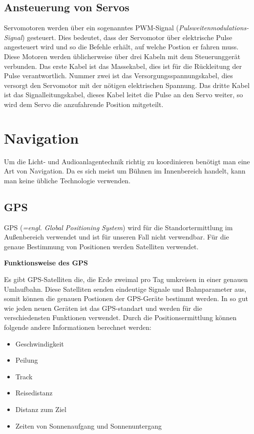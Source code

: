 \subsection{Ansteuerung von Servos}
Servomotoren werden über ein sogenanntes PWM-Signal (\emph{Pulsweitenmodulations-Signal}) gesteuert. Dies bedeutet, dass der Servomotor über elektrische Pulse angesteuert wird und so die Befehle erhält, auf welche Postion er fahren muss. Diese Motoren werden üblicherweise über drei Kabeln mit dem Steuerunggerät verbunden. Das erste Kabel ist das Massekabel, dies ist für die Rückleitung der Pulse verantwortlich. Nummer zwei ist das Versorgungsspannungskabel, dies versorgt den Servomotor mit der nötigen elektrischen Spannung. Das dritte Kabel ist das Signalleitungskabel, dieses Kabel leitet die Pulse an den Servo weiter, so wird dem Servo die anzufahrende Position mitgeteilt.\\
\cite{Servomotor_Ansteuerung}

\section{Navigation}

Um die Licht- und Audioanlagentechnik richtig zu koordinieren benötigt man eine Art von Navigation. Da es sich meist um Bühnen im Innenbereich handelt, kann man keine übliche Technologie verwenden.


\subsection{GPS}
GPS (\emph{=engl. Global Positioning System}) wird für die Standortermittlung im Außenbereich verwendet und ist für unseren Fall nicht verwendbar. Für die genaue Bestimmung von Positionen werden Satelliten verwendet.
\cite{GPS}

\textbf{Funktionsweise des GPS}

Es gibt GPS-Satelliten die, die Erde zweimal pro Tag umkreisen in einer genauen Umlaufbahn. Diese Satelliten senden eindeutige Signale und Bahnparameter aus, somit können die genauen Postionen der GPS-Geräte bestimmt werden. 
In so gut wie jeden neuen Geräten ist das GPS-standart und werden für die verschiedensten Funktionen verwendet. Durch die Positionsermittlung können folgende andere Informationen berechnet werden:

\begin{itemize}
	\item Geschwindigkeit
	\item Peilung
	\item Track
	\item Reisedistanz
	\item Distanz zum Ziel
	\item Zeiten von Sonnenaufgang und Sonnenuntergang
\end{itemize}


